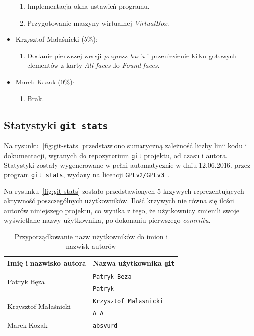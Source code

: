 \documentclass[a4paper,titlepage]{article}
\theoremstyle{break}
\numberwithin{equation}{subsection}
\begin{document}
\begin{appendices}
\begin{itemize}
\begin{enumerate}
		\item Implementacja okna ustawień programu.
		\item Przygotowanie maszyny wirtualnej \emph{VirtualBox}.
	\end{enumerate}
\item Krzysztof Małaśnicki (5\%):
	\begin{enumerate}
		\item Dodanie pierwszej wersji \emph{progress bar'a} i przeniesienie kilku gotowych elementów z karty \emph{All faces} do \emph{Found faces}.
	\end{enumerate}
\item Marek Kozak (0\%):
	\begin{enumerate}
		\item Brak.
	\end{enumerate}
\end{itemize}

\end{appendices}

\subsection{Statystyki \texttt{git stats}}

Na rysunku~\ref{fig:git-stats} przedstawiono sumaryczną zależność liczby linii kodu i dokumentacji, wgranych do repozytorium \texttt{git} projektu, od czasu i autora. Statystyki zostały wygenerowane w pełni automatycznie w dniu 12.06.2016, przez program \texttt{git~stats}, wydany na licencji \texttt{GPLv2/GPLv3}~\cite{www:git-stats}.

Na rysunku~\ref{fig:git-stats} zostało przedstawionych 5 krzywych reprezentujących aktywność poszczególnych użytkowników. Ilość krzywych nie równa się ilości autorów niniejszego projektu, co wynika z tego, że użytkownicy zmienili swoje wyświetlane nazwy użytkownika, po dokonaniu pierwszego \emph{commitu}.

\begin{table}[H]
\centering
\begin{tabular}{l|l}
Imię i nazwisko autora & Nazwa użytkownika \texttt{git}\\\hline\hline
\multirow{2}{*}{Patryk Bęza} & \texttt{Patryk Bęza}\\\cline{2-2}
& \texttt{Patryk}\\\hline
\multirow{2}{*}{Krzysztof Małaśnicki} & \texttt{Krzysztof Malasnicki}\\\cline{2-2}
& \texttt{A A}\\\hline
Marek Kozak & \texttt{absvurd}
\end{tabular}
\caption{Przyporządkowanie nazw użytkowników do imion i nazwisk autorów}
\end{table}
\end{document}
